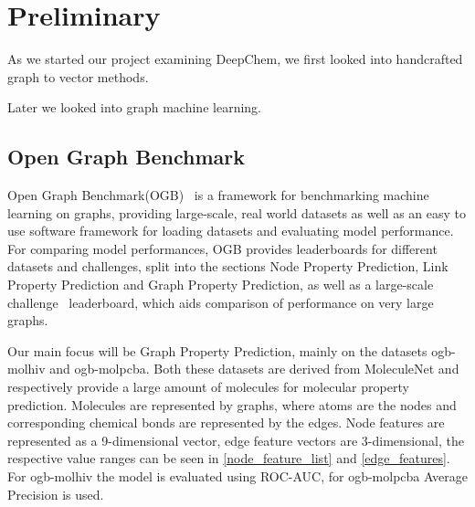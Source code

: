 \section{Preliminary}

As we started our project examining DeepChem, we first looked into handcrafted graph to vector methods.

Later we looked into graph machine learning.

\subsection{Open Graph Benchmark}
Open Graph Benchmark(OGB)~\cite{2021ogb} is a framework for benchmarking machine learning on graphs, providing large-scale, real world datasets as well as an easy to use software framework for loading  datasets and evaluating model performance.
For comparing model performances, OGB provides leaderboards for different datasets and challenges, split into the sections Node Property Prediction, Link Property Prediction and Graph Property Prediction, as well as a large-scale challenge~\cite{hu2021ogblsc} leaderboard, which aids comparison of performance on very large graphs.

Our main focus will be Graph Property Prediction, mainly on the datasets ogb-molhiv and ogb-molpcba. Both these datasets are derived from MoleculeNet and respectively provide a large amount of molecules for molecular property prediction. Molecules are represented by graphs, where atoms are the nodes and corresponding chemical bonds are represented by the edges. Node features are represented as a 9-dimensional vector, edge feature vectors are 3-dimensional, the respective value ranges can be seen in \autoref{node_feature_list} and \autoref{edge_features}.
For ogb-molhiv the model is evaluated using ROC-AUC, for ogb-molpcba Average Precision is used.

